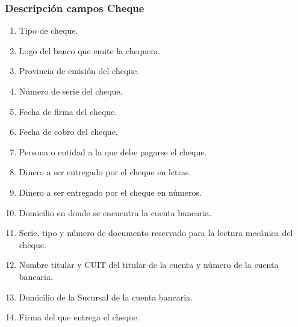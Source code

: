 \subsubsection{Descripción campos Cheque}
\begin{enumerate}
 \item Tipo de cheque.
 \item Logo del banco que emite la chequera.
 \item Provincia de emisi\'on del cheque.
 \item N\'umero de serie del cheque.
 \item Fecha de firma del cheque.
 \item Fecha de cobro del cheque.
 \item Persona o entidad a la que debe pagarse el cheque.
 \item Dinero a ser entregado por el cheque en letras.
 \item Dinero a ser entregado por el cheque en n\'umeros.
 \item Domicilio en donde se encuentra la cuenta bancaria.
 \item Serie, tipo y número de documento reservado para la lectura mecánica del cheque.
 \item Nombre titular y CUIT del titular de la cuenta y n\'umero de la cuenta bancaria.
 \item Domicilio de la Sucursal de la cuenta bancaria.
 \item Firma del que entrega el cheque.
\end{enumerate}


\pagebreak
